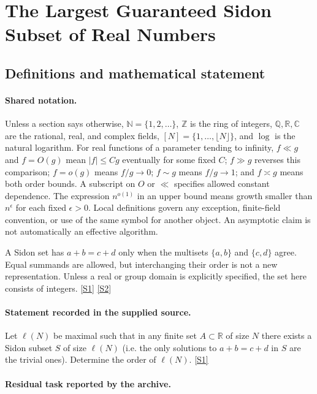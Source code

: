 \documentclass[11pt,a4paper]{article}
\newcommand{\N}{\mathbb{N}}
\newcommand{\Z}{\mathbb{Z}}
\newcommand{\Q}{\mathbb{Q}}
\newcommand{\R}{\mathbb{R}}
\newcommand{\C}{\mathbb{C}}
\newcommand{\sref}[2]{\hyperlink{source:#1:#2}{[S#2]}}
\begin{document}
\section{The Largest Guaranteed Sidon Subset of Real Numbers}\label{statement}


\subsection{Definitions and mathematical statement}

\paragraph{Shared notation.}Unless a section says otherwise, $\N=\{1,2,\ldots\}$,
$\Z$ is the ring of integers, $\Q,\R,\C$ are the rational, real, and complex
fields, $[N]=\{1,\ldots,\lfloor N\rfloor\}$, and $\log$ is the natural
logarithm. For real functions of a parameter tending to infinity,
$f\ll g$ and $f=O(g)$ mean $|f|\leq Cg$ eventually for some fixed $C$;
$f\gg g$ reverses this comparison; $f=o(g)$ means $f/g\to0$;
$f\sim g$ means $f/g\to1$; and $f\asymp g$ means both order bounds.
A subscript on $O$ or $\ll$ specifies allowed constant dependence.
The expression $n^{o(1)}$ in an upper bound means growth smaller than
$n^\epsilon$ for each fixed $\epsilon>0$. Local definitions govern any
exception, finite-field convention, or use of the same symbol for another
object. An asymptotic claim is not automatically an effective algorithm.



A Sidon set has $a+b=c+d$ only when the multisets $\{a,b\}$ and $\{c,d\}$ agree. Equal summands are allowed, but interchanging their order is not a new representation. Unless a real or group domain is explicitly specified, the set here consists of integers. \sref{statement}{1} \sref{statement}{2}

\paragraph{Statement recorded in the supplied source.}
Let $\ell(N)$ be maximal such that in any finite set $A\subset \mathbb{R}$ of size $N$ there exists a Sidon subset $S$ of size $\ell(N)$ (i.e. the only solutions to $a+b=c+d$ in $S$ are the trivial ones). Determine the order of $\ell(N)$. \sref{statement}{1}

\paragraph{Residual task reported by the archive.}
\end{document}
